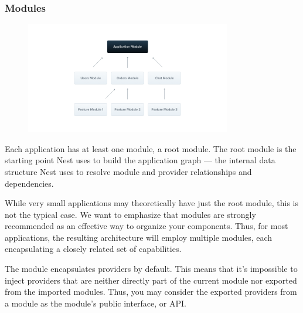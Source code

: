 \documentclass[a4paper]{article}
\numberwithin{equation}{section}
\begin{document}
\subsubsection{Modules}
\begin{figure}[H]
  \centering
  \includegraphics[width=0.8\textwidth]{./assets/p2/Modules_1.png}
\end{figure}

Each application has at least one module, a root module.
The root module is the starting point Nest uses to build the application graph --- the internal data structure Nest uses to resolve module and provider relationships and dependencies.

While very small applications may theoretically have just the root module, this is not the typical case.
We want to emphasize that modules are strongly recommended as an effective way to organize your components.
Thus, for most applications, the resulting architecture will employ multiple modules, each encapsulating a closely related set of capabilities.

The module encapsulates providers by default. This means that it's impossible to inject providers that are neither directly part of the current module nor exported from the imported modules. Thus, you may consider the exported providers from a module as the module's public interface, or API\@.
\end{document}
